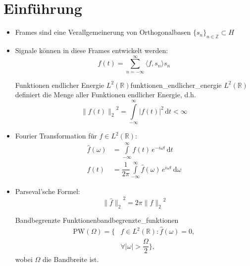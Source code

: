 		\section{Einführung}
        \begin{itemize}
                \item Frames sind eine Verallgemeinerung von Orthogonalbasen $\{s_{n}\}_{n \in \mathbb{Z}} \subset H$
          \item Signale können in diese Frames entwickelt werden:
                \begin{equation*}
                  f(t) = \sum\limits_{n=-\infty}^{\infty} \langle f, s_{n} \rangle s_{n}
                \end{equation*}
                \begin{boringDef}{Funktionen endlicher Energie $L^{2}(\mathbb{R})$}{funktionen_endlicher_energie}
                $L^{2}(\mathbb{R})$ definiert die Menge aller Funktionen endlicher Energie, d.h.\:
                \begin{equation*}
                  {\|f(t)\|_{2}}^{2} = \int\limits_{-\infty}^{\infty} |f(t)|^{2}\,\mathrm{d}t < \infty
                \end{equation*}
                \end{boringDef}
          \item Fourier Transformation für $f \in L^{2}(\mathbb{R})$:
                \begin{align*}
                  \hat{f}(\omega) &= \int\limits_{-\infty}^{\infty} f(t) \, e^{-i\omega t}\,\mathrm{d}t\\
                  f(t) &= \dfrac{1}{2\pi} \int\limits_{-\infty}^{\infty} \hat{f}(\omega) \, e^{i\omega t}\,\mathrm{d}\omega
                \end{align*}
          \item Parseval'sche Formel:
                \begin{equation*}
                  {\|\hat{f}\|_{2}}^{2} = 2\pi {\|f\|_{2}}^{2}
                \end{equation*}
                \begin{boringDef}{Bandbegrenzte Funktionen}{bandbegrenzte_funktionen}
                  \begin{align*}
                    \mathrm{PW}(\Omega) = \{&f \in L^{2}(\mathbb{R}): \hat{f}(\omega) = 0,\\
                    &\forall|\omega| > \dfrac{\Omega}{2}\},
                  \end{align*}
                  wobei $\Omega$ die Bandbreite ist.

\end{boringDef}
\end{itemize}
